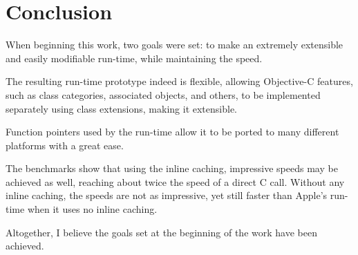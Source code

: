 \chapter*{Conclusion}

When beginning this work, two goals were set: to make an extremely extensible and easily modifiable run-time, while maintaining the speed.

The resulting run-time prototype indeed is flexible, allowing Objective-C features, such as class categories, associated objects, and others, to be implemented separately using class extensions, making it extensible.

Function pointers used by the run-time allow it to be ported to many different platforms with a great ease.

The benchmarks show that using the inline caching, impressive speeds may be achieved as well, reaching about twice the speed of a direct C call. Without any inline caching, the speeds are not as impressive, yet still faster than Apple's run-time when it uses no inline caching.

Altogether, I believe the goals set at the beginning of the work have been achieved.
